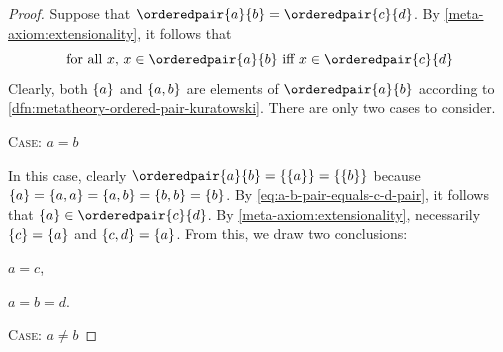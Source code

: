 \begin{proof}
    Suppose that \( \orderedpair{a}{b} = \orderedpair{c}{d} \).
    By \cref{meta-axiom:extensionality}, it follows that
    \begin{equation}
        \label{eq:a-b-pair-equals-c-d-pair}
        \text{for all \( x \), \( x \in \orderedpair{a}{b} \) iff \( x \in \orderedpair{c}{d} \)}
    \end{equation}
    Clearly, both \( \mleft\{ a \mright\} \) and \( \mleft\{ a, b \mright\} \) are elements of \( \orderedpair{a}{b} \) according
    to \cref{dfn:metatheory-ordered-pair-kuratowski}.
    There are only two cases to consider.

    \vspace{0.3cm}
    \noindent
    {\scshape Case:} \( a = b \)

    \vspace{0.1cm}
    \noindent
    In this case, clearly \( \orderedpair{a}{b} = \mleft\{ \mleft\{ a \mright\} \mright\} = \mleft\{ \mleft\{ b \mright\} \mright\} \) because
    \( \mleft\{ a \mright\} = \mleft\{ a, a \mright\} = \mleft\{ a, b \mright\} = \mleft\{ b, b \mright\} = \mleft\{ b \mright\}  \).
    By \eqref{eq:a-b-pair-equals-c-d-pair}, it follows that \( \mleft\{ a \mright\} \in \orderedpair{c}{d} \).
    By \cref{meta-axiom:extensionality}, necessarily \( \mleft\{ c \mright\} = \mleft\{ a \mright\} \) and \( \mleft\{ c, d \mright\} = \mleft\{ a \mright\} \).
    From this, we draw two conclusions:
    \begin{enumerate*}[label=(\arabic*)]
        \item \( a = c \),
        \item \( a = b = d\).
    \end{enumerate*}

    \vspace{0.3cm}
    \noindent
    {\scshape Case:} \( a \neq b \)


\end{proof}
